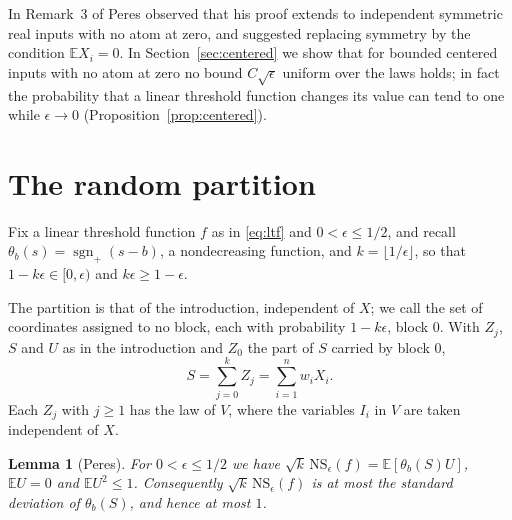 \documentclass[11pt]{amsart}
\newtheorem{lemma}[theorem]{Lemma}
\theoremstyle{remark}
\numberwithin{equation}{section}
\newcommand{\EE}{\mathbb{E}}
\newcommand{\sgnp}{\operatorname{sgn}_+}
\begin{document}
In Remark~3 of \cite{Per04} Peres observed that his proof extends to independent symmetric real inputs with no atom at zero, and suggested replacing symmetry by the condition $\EE X_i=0$. In Section~\ref{sec:centered} we show that for bounded centered inputs with no atom at zero no bound $C\sqrt\epsilon$ uniform over the laws holds; in fact the probability that a linear threshold function changes its value can tend to one while $\epsilon\to0$ (Proposition~\ref{prop:centered}).

\section{The random partition}\label{sec:partition}

Fix a linear threshold function $f$ as in \eqref{eq:ltf} and $0<\epsilon\le1/2$, and recall $\theta_b(s)=\sgnp(s-b)$, a nondecreasing function, and $k=\lfloor1/\epsilon\rfloor$, so that $1-k\epsilon\in[0,\epsilon)$ and $k\epsilon\ge1-\epsilon$.

The partition is that of the introduction, independent of $X$; we call the set of coordinates assigned to no block, each with probability $1-k\epsilon$, block $0$. With $Z_j$, $S$ and $U$ as in the introduction and $Z_0$ the part of $S$ carried by block $0$,
\[
S=\sum_{j=0}^kZ_j=\sum_{i=1}^nw_iX_i.
\]
Each $Z_j$ with $j\ge1$ has the law of $V$, where the variables $I_i$ in $V$ are taken independent of $X$.

\begin{lemma}[Peres]\label{lem:block}
For $0<\epsilon\le1/2$ we have $\sqrt k\,\mathrm{NS}_\epsilon(f)=\EE[\theta_b(S)U]$, $\EE U=0$ and $\EE U^2\le1$. Consequently $\sqrt k\,\mathrm{NS}_\epsilon(f)$ is at most the standard deviation of $\theta_b(S)$, and hence at most $1$.
\end{lemma}
\end{document}
